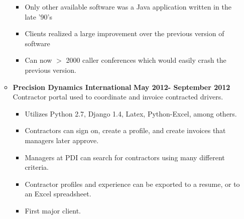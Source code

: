 \documentclass[overlapped]{res}
\begin{document}
\begin{resume}
\begin{itemize}[leftmargin=0in]
\begin{itemize}[leftmargin=0in]
\begin{samepage}
\begin{itemize}
                        \item[\textbullet] Only other available software was a Java application written in the late '90's
                        \item[\textbullet] Clients realized a large improvement over the previous version of software
                        \item[\textbullet] Can now $>$ 2000 caller conferences which would easily crash the previous version.
                    \end{itemize}
                \end{samepage}
            \item[]
                \begin{samepage}
                    \textbf{Precision Dynamics International} \hfill \textbf{May 2012- September 2012} \\
                    Contractor portal used to coordinate and invoice contracted drivers.
                    \begin{itemize}
                        \item[\textbullet] Utilizes Python 2.7, Django 1.4, Latex, Python-Excel, among others.
                        \item[\textbullet] Contractors can sign on, create a profile, and create invoices that managers later approve.
                        \item[\textbullet] Managers at PDI can search for contractors using many different criteria.
                        \item[\textbullet] Contractor profiles and experience can be exported to a resume, or to an Excel spreadsheet.
                        \item[\textbullet] First major client.
                    \end{itemize}
                \end{samepage}
        \end{itemize}
\end{itemize}
\vspace{0.25in}


\end{resume}
\end{document}
